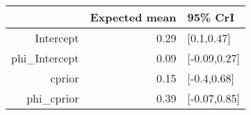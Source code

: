 \begin{tabular}{rrl}
  \hline
 & Expected mean & 95\% CrI \\ 
  \hline
Intercept & 0.29 & [0.1,0.47] \\ 
  phi\_Intercept & 0.09 & [-0.09,0.27] \\ 
  cprior & 0.15 & [-0.4,0.68] \\ 
  phi\_cprior & 0.39 & [-0.07,0.85] \\ 
   \hline
\end{tabular}

